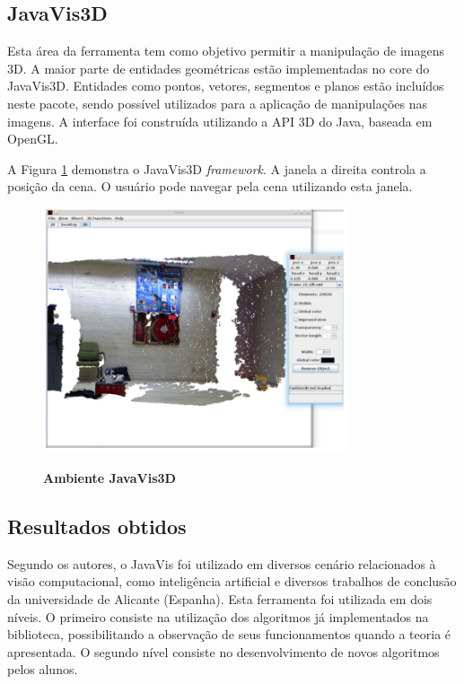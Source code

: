 \documentclass[
	12pt,				%
	oneside,			%
	a4paper,			%
	english,			%
	french,				%
	spanish,			%
	brazil,				%
	]{abntex2}
\begin{document}
\subsection{JavaVis3D}

Esta área da ferramenta tem como objetivo permitir a manipulação de imagens 3D. A maior parte de entidades geométricas estão implementadas no core do JavaVis3D. Entidades como pontos, vetores, segmentos e planos estão incluídos neste pacote, sendo possível utilizados para a aplicação de manipulações nas imagens. A interface foi construída utilizando a API 3D do Java, baseada em OpenGL.

A Figura \ref{fig:javavis_3d} demonstra o JavaVis3D \textit{framework}. A janela a direita controla a posição da cena. O usuário pode navegar pela cena utilizando esta janela.

\begin{figure}[ht]
\centering
\caption{\textbf{Ambiente JavaVis3D}}
\includegraphics[width=0.8\textwidth]{imagens/javavis_3d.png}
\label{fig:javavis_3d}
\end{figure}

\subsection{Resultados obtidos}

Segundo os autores, o JavaVis foi utilizado em diversos cenário relacionados à visão computacional, como inteligência artificial e diversos trabalhos de conclusão da universidade de Alicante (Espanha). Esta ferramenta foi utilizada em dois níveis. O primeiro consiste na utilização dos algoritmos já implementados na biblioteca, possibilitando a observação de seus funcionamentos quando a teoria é apresentada. O segundo nível consiste no desenvolvimento de novos algoritmos pelos alunos.
\end{document}
